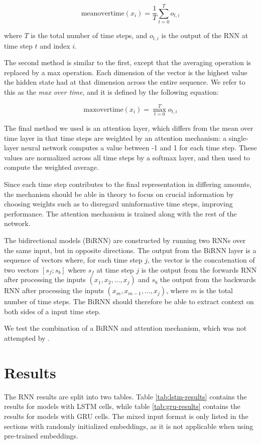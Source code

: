 \[
  \mathrm{meanovertime}(x_i) = \frac{1}{T}\sum_{t=0}^T o_{t,i}
\]

where $T$ is the total number of time steps, and $o_{t,i}$ is the output of
the RNN at time step $t$ and index $i$.

The second method is similar to the first, except that the averaging
operation is replaced by a max operation. Each dimension of the vector is the
highest value the hidden state had at that dimension across the entire
sequence. We refer to this as the \emph{max over time}, and it is defined by
the following equation:

\[
  \mathrm{maxovertime}(x_i) = \max_{t=0}^T o_{t,i}
\]

The final method we used is an attention layer, which differs from the mean
over time layer in that time steps are weighted by an attention mechanism: a
single-layer neural network computes a value between -1 and 1 for each time
step. These values are normalized across all time steps by a softmax layer,
and then used to compute the weighted average.

Since each time step contributes to the final representation in differing
amounts, the mechanism should be able in theory to focus on crucial
information by choosing weights such as to disregard uninformative time
steps, improving performance. The attention mechanism is trained along with
the rest of the network.

The bidirectional models (BiRNN) are constructed by running two \acp{RNN}
over the same input, but in opposite directions. The output from the BiRNN
layer is a sequence of vectors where, for each time step $j$, the vector is
the concatenation of two vectors $[s_f;s_b]$ where $s_f$ at time step $j$ is
the output from the forwards \ac{RNN} after processing the inputs $(x_1, x_2,
\ldots, x_j)$ and $s_b$ the output from the backwards \ac{RNN} after
processing the inputs $(x_m, x_{m-1}, \ldots, x_j)$, where $m$ is the total
number of time steps. The BiRNN should therefore be able to extract context
on both sides of a input time step.

We test the combination of a BiRNN and attention mechanism, which was not
attempted by \textcite{taghipour16}.


\section{Results}

The RNN results are split into two tables. Table \ref{tab:lstm-results}
contains the results for models with \ac{LSTM} cells, while table
\ref{tab:gru-results} contains the results for models with \ac{GRU} cells.
The mixed input format is only listed in the sections with randomly
initialized embeddings, as it is not applicable when using pre-trained
embeddings.

